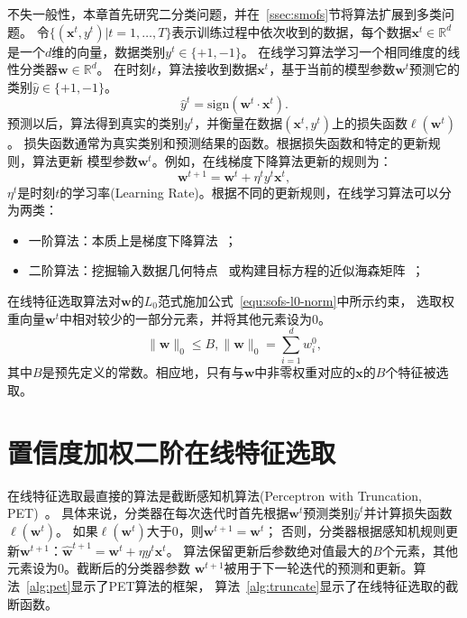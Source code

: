 \documentclass[doctor]{ustcthesis}
\def \w  {\mathbf{w}}
\def \x {\mathbf{x}}
\def \R {\mathbb{R}}
\def \sign {\mathrm{sign}}
\begin{document}
不失一般性，本章首先研究二分类问题，并在~\ref{ssec:smofs}节将算法扩展到多类问题。
令$\{(\x^t,y^t)|t=1,\ldots, T\}$表示训练过程中依次收到的数据，每个数据$\x^t
\in \R^d$是一个$d$维的向量，数据类别$y^t\in\{+1,-1\}$。
在线学习算法学习一个相同维度的线性分类器$\w \in \R^d$。
在时刻$t$，算法接收到数据$\x^t$，基于当前的模型参数$\w^t$预测它的类别$\hat{y}\in\{+1,-1\}$。
\begin{equation}\label{eqn:predict}
    \hat{y}^t = \sign(\w^t \cdot \x^t).
\end{equation}
预测以后，算法得到真实的类别$y^t$，并衡量在数据$(\x^t,y^t)$上的损失函数$\ell(\w^t)$。
损失函数通常为真实类别和预测结果的函数。根据损失函数和特定的更新规则，算法更新
模型参数$\w^t$。例如，在线梯度下降算法更新的规则为：
\begin{equation}
    \w^{t+1} = \w^t + \eta^ty^t\x^t,
\end{equation}
$\eta^t$是时刻$t$的学习率(Learning Rate)。根据不同的更新规则，在线学习算法可以分为两类：
\vspace{-0.8em}
\begin{itemize}\setlength{\itemsep}{-0.5em}
    \item 一阶算法：本质上是梯度下降算法~\cite{crammer2006online}；
    \item 二阶算法：挖掘输入数据几何特点~\cite{crammer2009adaptive}
        或构建目标方程的近似海森矩阵~\cite{duchi2011adaptive}；
\end{itemize}

在线特征选取算法对$\w$的$L_0$范式施加公式~\eqref{equ:sofs-l0-norm}中所示约束，
选取权重向量$\w^t$中相对较少的一部分元素，并将其他元素设为$0$。
\begin{equation}
    \label{equ:sofs-l0-norm}
    \|\w\|_0 \leq B, \|\w\|_0 = \sum_{i=1}^d w_i^0,
\end{equation}
其中$B$是预先定义的常数。相应地，只有与$\w$中非零权重对应的$\x$的$B$个特征被选取。

\section{置信度加权二阶在线特征选取}
在线特征选取最直接的算法是截断感知机算法(Perceptron with Truncation, PET)~\cite{wang2014online}。
具体来说，分类器在每次迭代时首先根据$\w^t$预测类别$\hat{y}^t$并计算损失函数$\ell(\w^t)$。
如果$\ell(\w^t)$大于0，则$\w^{t+1}=\w^t$；
否则，分类器根据感知机规则更新$\w^{t+1}$：$\hat{\w}^{t+1} = \w^t + \eta y^t\x^t$。
算法保留更新后参数绝对值最大的$B$个元素，其他元素设为$0$。截断后的分类器参数
$\w^{t+1}$被用于下一轮迭代的预测和更新。算法~\ref{alg:pet}显示了PET算法的框架，
算法~\ref{alg:truncate}显示了在线特征选取的截断函数。
\end{document}
